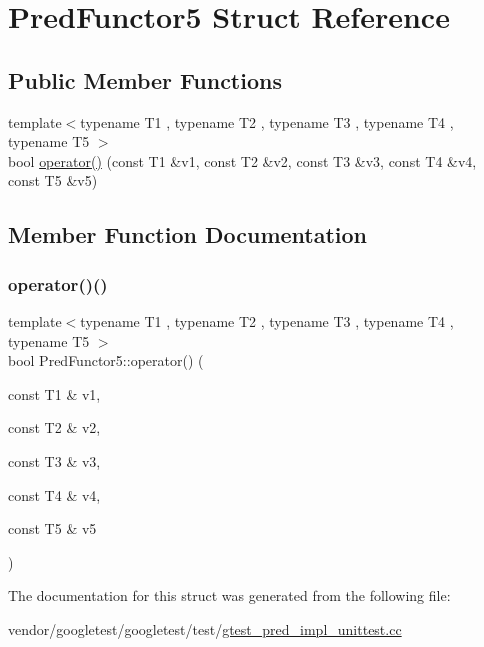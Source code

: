 \hypertarget{struct_pred_functor5}{}\section{Pred\+Functor5 Struct Reference}
\label{struct_pred_functor5}
\subsection*{Public Member Functions}
\begin{DoxyCompactItemize}
\item 
{\footnotesize template$<$typename T1 , typename T2 , typename T3 , typename T4 , typename T5 $>$ }\\bool \hyperlink{struct_pred_functor5_af9decf4d509848479ccdc4fe90129a06}{operator()} (const T1 \&v1, const T2 \&v2, const T3 \&v3, const T4 \&v4, const T5 \&v5)
\end{DoxyCompactItemize}


\subsection{Member Function Documentation}
\mbox{\label{struct_pred_functor5_af9decf4d509848479ccdc4fe90129a06}} 
\subsubsection{\texorpdfstring{operator()()}{operator()()}}
{\footnotesize\ttfamily template$<$typename T1 , typename T2 , typename T3 , typename T4 , typename T5 $>$ \\
bool Pred\+Functor5\+::operator() (\begin{DoxyParamCaption}\item[{const T1 \&}]{v1,  }\item[{const T2 \&}]{v2,  }\item[{const T3 \&}]{v3,  }\item[{const T4 \&}]{v4,  }\item[{const T5 \&}]{v5 }\end{DoxyParamCaption})\hspace{0.3cm}{\ttfamily [inline]}}



The documentation for this struct was generated from the following file\+:\begin{DoxyCompactItemize}
\item 
vendor/googletest/googletest/test/\hyperlink{gtest__pred__impl__unittest_8cc}{gtest\+\_\+pred\+\_\+impl\+\_\+unittest.\+cc}\end{DoxyCompactItemize}
